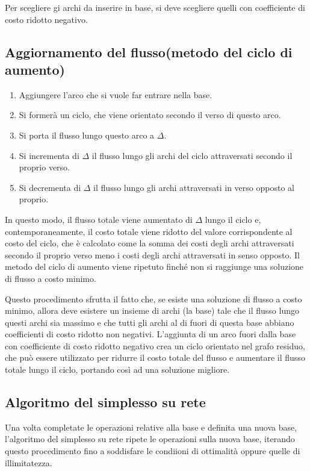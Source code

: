 Per scegliere gi archi da inserire in base, si deve scegliere quelli con coefficiente di costo ridotto negativo.


\subsection{Aggiornamento del flusso(metodo del ciclo di aumento)}
\begin{enumerate}
\item Aggiungere l'arco che si vuole far entrare nella base.
\item Si formerà un ciclo, che viene orientato secondo il verso di questo arco.
\item Si porta il flusso lungo questo arco a $\Delta$.
\item Si incrementa di $\Delta$ il flusso lungo gli archi del ciclo attraversati secondo il proprio verso.
\item Si decrementa di $\Delta$ il flusso lungo gli archi attraversati in verso opposto al proprio.
\end{enumerate}

In questo modo, il flusso totale viene aumentato di $\Delta$ lungo il ciclo e, contemporaneamente, il costo totale viene ridotto del valore corrispondente al costo del ciclo, che è calcolato come la somma dei costi degli archi attraversati secondo il proprio verso meno i costi degli archi attraversati in senso opposto. Il metodo del ciclo di aumento viene ripetuto finché non si raggiunge una soluzione di flusso a costo minimo.

Questo procedimento sfrutta il fatto che, se esiste una soluzione di flusso a costo minimo, allora deve esistere un insieme di archi (la base) tale che il flusso lungo questi archi sia massimo e che tutti gli archi al di fuori di questa base abbiano coefficienti di costo ridotto non negativi. L'aggiunta di un arco fuori dalla base con coefficiente di costo ridotto negativo crea un ciclo orientato nel grafo residuo, che può essere utilizzato per ridurre il costo totale del flusso e aumentare il flusso totale lungo il ciclo, portando così ad una soluzione migliore.


\subsection{Algoritmo del simplesso su rete}
Una volta completate le operazioni relative alla base e definita una nuova base, 
l'algoritmo del simplesso su rete ripete le operazioni sulla nuova base, iterando
questo procedimento fino a soddisfare le condiioni di ottimalità oppure quelle 
di illimitatezza.

